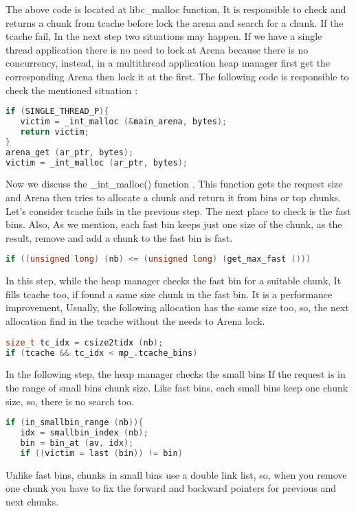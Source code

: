 \documentclass{masterthesis}
\newcommand*\tch{tcache}
\begin{document}
The above code is located at libc\_malloc function, It is responsible to check and returns a chunk from tcache before lock the arena and search for a chunk. If the \tch{} fail, In the next step two situations may happen. If we have a single thread application there is no need to lock at Arena because there is no concurrency, instead, in a multi\-thread application heap manager first get the corresponding Arena then lock it at the first. The following code is responsible to check the mentioned situation :
\begin{lstlisting}[language=c,frame=tlrb]
if (SINGLE_THREAD_P){
   victim = _int_malloc (&main_arena, bytes);
   return victim;
}
arena_get (ar_ptr, bytes);
victim = _int_malloc (ar_ptr, bytes);
\end{lstlisting}

Now we discuss the \_int\_malloc() function . This function gets the request size and Arena then tries to allocate a chunk and return it from bins or top chunks. Let's consider \tch{} fails in the previous step. The next place to check is the fast bins. Also, As we mention, each fast bin keeps just one size of the chunk, as the result, remove and add a chunk to the fast bin is fast.
\begin{lstlisting}[language=c,frame=tlrb]
if ((unsigned long) (nb) <= (unsigned long) (get_max_fast ()))
\end{lstlisting}
In this step, while the heap manager checks the fast bin for a suitable chunk, It fills \tch{} too, if found a same size chunk in the fast bin. It is a performance improvement, Usually, the following allocation has the same size too, so, the next allocation find in the \tch{} without the needs to Arena lock.
\begin{lstlisting}[language=c,frame=tlrb]
size_t tc_idx = csize2tidx (nb);
if (tcache && tc_idx < mp_.tcache_bins)
\end{lstlisting}

In the following step, the heap manager checks the small bins If the request is in the range of small bins chunk size. Like fast bins, each small bins keep one chunk size, so, there is no search too.
\begin{lstlisting}[language=c,frame=tlrb]
if (in_smallbin_range (nb)){
   idx = smallbin_index (nb);
   bin = bin_at (av, idx);
   if ((victim = last (bin)) != bin)
\end{lstlisting}

Unlike fast bins, chunks in small bins use a double link list, so, when you remove one chunk you have to fix the forward and backward pointers for previous and next chunks. 
\end{document}
